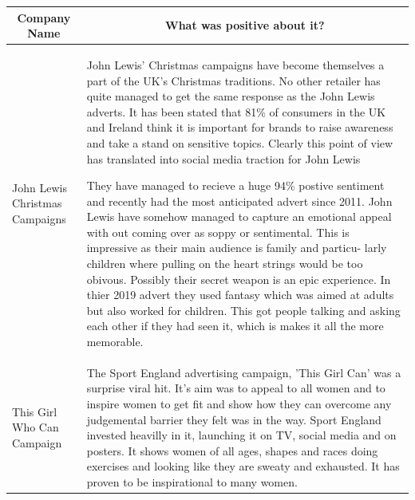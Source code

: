 \documentclass{article}
\begin{document}
\FloatBarrier
\begin{table}[htbp]
    \centering
    \begin{tabular}{|p{}|p{}|}
       \hline
       \multicolumn{1}{c}{\bfseries Company Name} & \multicolumn{1}{c}{\bfseries What was positive about it?}  \\
             \hline
         John Lewis Christmas Campaigns & John Lewis' Christmas campaigns have become themselves a part of the UK's Christmas traditions. No other retailer has quite managed to get the same response as the John Lewis adverts. It has been stated that 81\% of consumers in the UK and Ireland think it is important for brands to raise awareness and take a stand on sensitive topics. Clearly this point of view has translated into social media traction for John Lewis \cite{JohnLewisChristmasCampaigns}


They have managed to recieve a huge 94\% postive sentiment and recently had the most anticipated advert since 2011. \cite{JohnLewisPowerful}  John Lewis have somehow managed to capture an emotional appeal with out coming over as soppy or sentimental. This is impressive as their main audience is family and particu- larly children where pulling on the heart strings would be too obivous. Possibly their secret weapon is an epic experience.  In thier 2019 advert they used fantasy which was aimed at adults but also worked for children. This got people talking and asking each other if they had seen it, which is makes it all the more memorable. \cite{JohnLewisPowerful} \\
        \hline
	This Girl Who Can Campaign & The Sport England advertising campaign, 'This Girl Can' was a surprise viral hit. It's aim was to appeal to all women and to inspire women to get fit and show how they can overcome any judgemental barrier they felt was in the way. Sport England invested heavilly in it, launching it on TV, social media and on posters. It shows women of all ages, shapes and races doing exercises and looking like they are sweaty and exhausted. It has proven to be inspirational to many women. \cite{ThisGirlCan}\\
        \hline
    \end{tabular}

\end{table}
\end{document}
